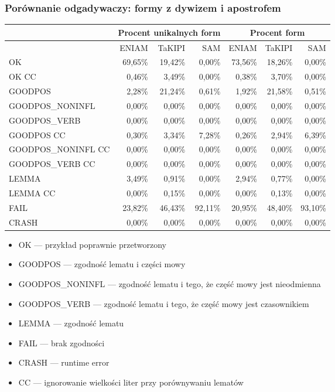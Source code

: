 \documentclass{beamer}
\begin{document}
\begin{frame}
\frametitle{Porównanie odgadywaczy: formy z dywizem i apostrofem}
\begin{center}\begin{scriptsize}
\begin{tabular}{l|rrr|rrr}
& \multicolumn{3}{c|}{Procent unikalnych form} &
\multicolumn{3}{c}{Procent form} \\
\hline
& ENIAM & TaKIPI & SAM & ENIAM & TaKIPI & SAM \\
\hline
OK & 69,65\% & 19,42\% & 0,00\% & 73,56\% & 18,26\% & 0,00\% \\
OK CC & 0,46\% & 3,49\% & 0,00\% & 0,38\% & 3,70\% & 0,00\% \\
GOODPOS & 2,28\% & 21,24\% & 0,61\% & 1,92\% & 21,58\% & 0,51\% \\
GOODPOS\_NONINFL & 0,00\% & 0,00\% & 0,00\% & 0,00\% & 0,00\% & 0,00\% \\
GOODPOS\_VERB & 0,00\% & 0,00\% & 0,00\% & 0,00\% & 0,00\% & 0,00\% \\
GOODPOS CC & 0,30\% & 3,34\% & 7,28\% & 0,26\% & 2,94\% & 6,39\% \\
GOODPOS\_NONINFL CC & 0,00\% & 0,00\% & 0,00\% & 0,00\% & 0,00\% & 0,00\% \\
GOODPOS\_VERB CC & 0,00\% & 0,00\% & 0,00\% & 0,00\% & 0,00\% & 0,00\% \\
LEMMA & 3,49\% & 0,91\% & 0,00\% & 2,94\% & 0,77\% & 0,00\% \\
LEMMA CC & 0,00\% & 0,15\% & 0,00\% & 0,00\% & 0,13\% & 0,00\% \\
FAIL & 23,82\% & 46,43\% & 92,11\% & 20,95\% & 48,40\% & 93,10\% \\
CRASH & 0,00\% & 0,00\% & 0,00\% & 0,00\% & 0,00\% & 0,00\% \\
\end{tabular}
\end{scriptsize}\end{center}
\begin{scriptsize}\begin{itemize}
\item OK --- przykład poprawnie przetworzony
\item GOODPOS --- zgodność lematu i części mowy
\item GOODPOS\_NONINFL --- zgodność lematu i tego, że część mowy jest nieodmienna
\item GOODPOS\_VERB --- zgodność lematu i tego, że część mowy jest czasownikiem
\item LEMMA --- zgodność lematu
\item FAIL --- brak zgodności
\item CRASH --- runtime error
\item CC --- ignorowanie wielkości liter przy porównywaniu lematów
\end{itemize}\end{scriptsize}
\end{frame}
\end{document}
